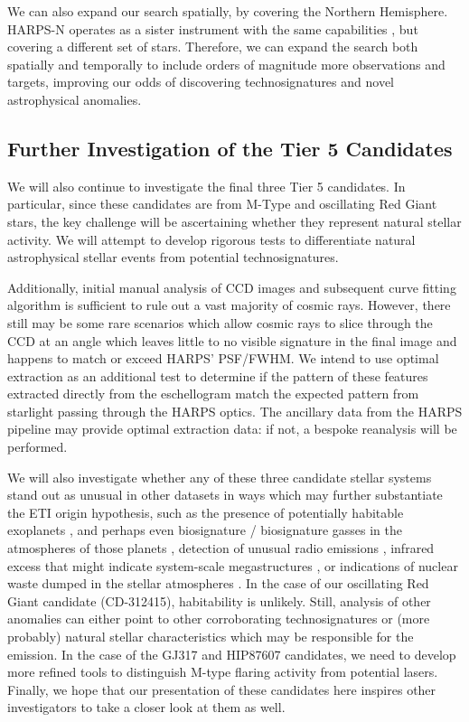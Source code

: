 \documentclass[twocolumn]{aastex701}
\begin{document}
We can also expand our search spatially, by covering the Northern Hemisphere. HARPS-N operates as a sister instrument with the same capabilities \citep{HARPS_N}, but covering a different set of stars. Therefore, we can expand the search both spatially and temporally to include orders of magnitude more observations and targets, improving our odds of discovering technosignatures and novel astrophysical anomalies.

\subsection{Further Investigation of the Tier 5 Candidates}

We will also continue to investigate the final three Tier 5 candidates. In particular, since these candidates are from M-Type and oscillating Red Giant stars, the key challenge will be ascertaining whether they represent natural stellar activity. We will attempt to develop rigorous tests to differentiate natural astrophysical stellar events from potential technosignatures. 

Additionally, initial manual analysis of CCD images and subsequent curve fitting algorithm is sufficient to rule out a vast majority of cosmic rays. However, there still may be some rare scenarios which allow cosmic rays to slice through the CCD at an angle which leaves little to no visible signature in the final image and happens to match or exceed HARPS' PSF/FWHM. We intend to use optimal extraction \citep{horne86optimal_extraction} as an additional test to determine if the pattern of these features extracted directly from the eschellogram  match the expected pattern from starlight passing through the HARPS optics. The ancillary data from the HARPS pipeline \citep{HARPS_specs} may provide optimal extraction data: if not, a bespoke reanalysis will be performed. 

We will also investigate whether any of these three candidate stellar systems stand out as unusual in other datasets in ways which may further substantiate the ETI origin hypothesis, such as the presence of potentially habitable exoplanets \citep{exoplanets}, and perhaps even biosignature / biosignature gasses in the atmospheres of those planets \citep{exoplanetbiosignatures,HAQQMISRA2022194}, detection of unusual radio emissions \citep{BACKUS1998651}, infrared excess that might indicate system-scale megastructures \citep{dysonspheres,TILGNER1998607}, or indications of nuclear waste dumped in the stellar atmospheres \citep{WHITMIRE1980149}. In the case of our oscillating Red Giant candidate (CD-312415), habitability is  unlikely. Still, analysis of other anomalies can either point to other corroborating technosignatures or (more probably) natural stellar characteristics which may be responsible for the emission. In the case of the GJ317 and HIP87607 candidates, we need to develop more refined tools to distinguish M-type flaring activity from potential lasers. Finally, we hope that our presentation of these candidates here inspires other investigators to take a closer look at them as well.
\end{document}
